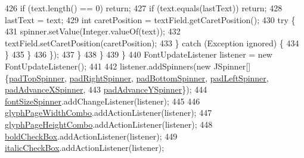 \begin{DoxyCode}
426                             \textcolor{keywordflow}{if} (text.length() == 0) \textcolor{keywordflow}{return};
427                             \textcolor{keywordflow}{if} (text.equals(lastText)) \textcolor{keywordflow}{return};
428                             lastText = text;
429                             \textcolor{keywordtype}{int} caretPosition = textField.getCaretPosition();
430                             \textcolor{keywordflow}{try} \{
431                                 spinner.setValue(Integer.valueOf(text));
432                                 textField.setCaretPosition(caretPosition);
433                             \} \textcolor{keywordflow}{catch} (Exception ignored) \{
434                             \}
435                         \}
436                     \});
437                 \}
438             \}
439         \}
440         FontUpdateListener listener = \textcolor{keyword}{new} FontUpdateListener();
441 
442         listener.addSpinners(\textcolor{keyword}{new} JSpinner[] \{\mbox{\hyperlink{classorg_1_1newdawn_1_1slick_1_1tools_1_1hiero_1_1_hiero_a10d07901d4b2d2729d228eb329ff873a}{padTopSpinner}}, 
      \mbox{\hyperlink{classorg_1_1newdawn_1_1slick_1_1tools_1_1hiero_1_1_hiero_a2c0741d232f9cd9054bdb82cc9d0c8b3}{padRightSpinner}}, \mbox{\hyperlink{classorg_1_1newdawn_1_1slick_1_1tools_1_1hiero_1_1_hiero_ad1d65973a4b07eaa6b4e8f6638fa6d1b}{padBottomSpinner}}, \mbox{\hyperlink{classorg_1_1newdawn_1_1slick_1_1tools_1_1hiero_1_1_hiero_a2396ca8d40bd31d5ccafc3bfa683eb6d}{padLeftSpinner}}, 
      \mbox{\hyperlink{classorg_1_1newdawn_1_1slick_1_1tools_1_1hiero_1_1_hiero_afd022869253bd23ee0daf1f0f06966ae}{padAdvanceXSpinner}},
443             \mbox{\hyperlink{classorg_1_1newdawn_1_1slick_1_1tools_1_1hiero_1_1_hiero_a5d9233b804a0a3506880e5ff43dddcad}{padAdvanceYSpinner}}\});
444         \mbox{\hyperlink{classorg_1_1newdawn_1_1slick_1_1tools_1_1hiero_1_1_hiero_ad5c1f797cd6441f6df9618124e3d6d77}{fontSizeSpinner}}.addChangeListener(listener);
445 
446         \mbox{\hyperlink{classorg_1_1newdawn_1_1slick_1_1tools_1_1hiero_1_1_hiero_a27e8ebe1ca05ea8252bf38dc2bb73b02}{glyphPageWidthCombo}}.addActionListener(listener);
447         \mbox{\hyperlink{classorg_1_1newdawn_1_1slick_1_1tools_1_1hiero_1_1_hiero_af25be89f1cd46381e5e6fc93a02de118}{glyphPageHeightCombo}}.addActionListener(listener);
448         \mbox{\hyperlink{classorg_1_1newdawn_1_1slick_1_1tools_1_1hiero_1_1_hiero_a605e35729a7fd5437c5fa9692cd44c74}{boldCheckBox}}.addActionListener(listener);
449         \mbox{\hyperlink{classorg_1_1newdawn_1_1slick_1_1tools_1_1hiero_1_1_hiero_a4c571b425b96934d5298ae39b155db87}{italicCheckBox}}.addActionListener(listener);

\end{DoxyCode}
